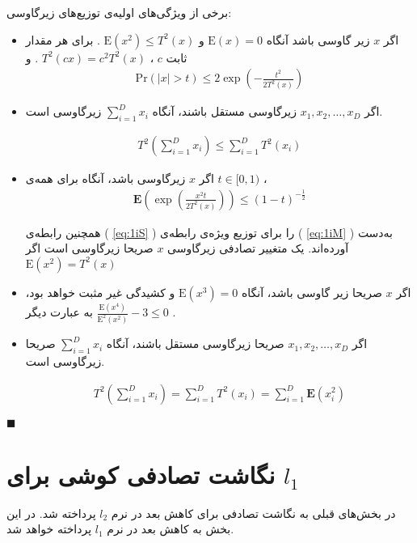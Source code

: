 برخی از ویژگی‌های اولیه‌ی توزیع‌های زیرگاوسی:

\begin{itemize}
\item
اگر 
$x$
زیر گاوسی باشد آنگاه 
$\mathrm{E}(x) = 0$
و 
$\mathrm{E}(x^2) \leq T^2(x)$
. برای هر مقدار ثابت 
$c$
، 
$T^2(cx) = c^2T^2(x)$
. و
\begin{align}
\mathrm{Pr}(|x| > t) \leq 2 \exp \left( - \frac{t^2}{2T^2(x)} \right)
\label{eq:1iQ}
\end{align}
\item
اگر 
$x_1, x_2, \ldots, x_D$
زیرگاوسی مستقل باشند، آنگاه
$\sum_{i=1}^D x_i$
زیرگاوسی است.

\begin{align}
T^2 \left( \sum_{i=1}^D x_i \right) \leq \sum_{i=1}^D T^2(x_i)
\label{eq:1iR.0}
\end{align}
\item
اگر 
$x$
زیرگاوسی باشد، آنگاه برای همه‌ی 
$t \in [0,1)$
،
\begin{align}
\mathbf{E} \left( \exp \left( \frac{x^2 t}{2 T^2(x)} \right) \right) \leq (1-t)^{- \frac{1}{2}}
\label{eq:1iS}
\end{align}

\cite{litez2, litez3}
همچنین رابطه‌ی (%
\ref{eq:1iS}%
) را برای توزیع ویژه‌ی رابطه‌ی (%
\ref{eq:1iM}%
) به‌دست آورده‌اند. یک متغییر تصادفی زیرگاوسی
$x$
صریحا زیرگاوسی است اگر 
$\mathrm{E}(x^2) = T^2(x)$
\item
اگر 
$x$
صریحا زیر گاوسی باشد، آنگاه 
‌$\mathrm{E}(x^3)=0$
و کشیدگی%
غیر مثبت خواهد بود، به عبارت دیگر 
$\frac{\mathrm{E}(x^4)}{\mathrm{E}^2(x^2)} - 3 \leq 0$
.
\item
اگر
$x_1, x_2, \ldots, x_D$
صریحا زیرگاوسی مستقل باشند، آنگاه
$\sum_{i=1}^D x_i$
صریحا زیرگاوسی است.

\begin{align}
T^2 \left( \sum_{i=1}^D x_i \right) = \sum_{i=1}^D T^2(x_i)
= \sum_{i=1}^D \mathbf{E} \left( x_i^2 \right)
\label{eq:1iR.1}
\end{align}
\end{itemize}

$\blacksquare$
\bigskip


\section{
نگاشت تصادفی کوشی برای 
$l_1$
}
در بخش‌های قبلی به نگاشت تصادفی برای کاهش بعد در نرم 
$l_2$
پرداخته شد. در این بخش به کاهش بعد در نرم
$l_1$
پرداخته خواهد شد. 

